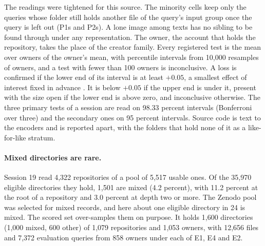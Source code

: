 \documentclass[11pt]{article}
\begin{document}
The readings were tightened for this source. The minority cells keep only the queries whose folder still holds another file of the query's input group once the query is left out (P1s and P2s). A lone image among texts has no sibling to be found through under any representation. The owner, the account that holds the repository, takes the place of the creator family. Every registered test is the mean over owners of the owner's mean, with percentile intervals from 10,000 resamples of owners, and a test with fewer than 100 owners is inconclusive. A loss is confirmed if the lower end of its interval is at least $+0.05$, a smallest effect of interest fixed in advance \citep{lakens2018equivalence}. It is below $+0.05$ if the upper end is under it, present with the size open if the lower end is above zero, and inconclusive otherwise. The three primary tests of a session are read on 98.33 percent intervals (Bonferroni over three) and the secondary ones on 95 percent intervals. Source code is text to the encoders and is reported apart, with the folders that hold none of it as a like-for-like stratum.

\paragraph{Mixed directories are rare.} Session 19 read 4,322 repositories of a pool of 5,517 usable ones. Of the 35,970 eligible directories they hold, 1,501 are mixed (4.2 percent), with 11.2 percent at the root of a repository and 3.0 percent at depth two or more. The Zenodo pool was selected for mixed records, and here about one eligible directory in 24 is mixed. The scored set over-samples them on purpose. It holds 1,600 directories (1,000 mixed, 600 other) of 1,079 repositories and 1,053 owners, with 12,656 files and 7,372 evaluation queries from 858 owners under each of E1, E4 and E2.
\end{document}
